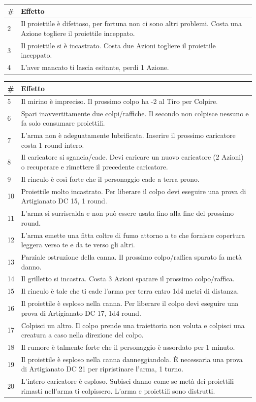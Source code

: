 \begin{multicols}{2}
\noindent\begin{tabularx}{0.48\textwidth}{lX}
	\toprule
\textbf{\#}& \textbf{Effetto}\\
\toprule
2 & Il proiettile è difettoso, per fortuna non ci sono altri problemi. Costa una Azione togliere il proiettile inceppato.\\
3 & Il proiettile si è incastrato. Costa due Azioni togliere il proiettile inceppato.\\
4 & L'aver mancato ti lascia esitante, perdi 1 Azione.\\
\end{tabularx}
\noindent\begin{tabularx}{0.48\textwidth}{lX}
\textbf{\#}& \textbf{Effetto}\\
\toprule
5 & Il mirino è impreciso. Il prossimo colpo ha -2 al Tiro per Colpire.\\
6 & Spari inavvertitamente due colpi/raffiche. Il secondo non colpisce nessuno e fa solo consumare proiettili.\\
7 & L'arma non è adeguatamente lubrificata. Inserire il prossimo caricatore costa 1 round intero.\\
8 & Il caricatore si sgancia/cade. Devi caricare un nuovo caricatore (2 Azioni) o recuperare e rimettere il precedente caricatore.\\
9 & Il rinculo è così forte che il personaggio cade a terra prono.\\
10 & Proiettile molto incastrato. Per liberare il colpo devi eseguire una prova di Artigianato DC 15, 1 round.\\
11 & L'arma si surriscalda e non può essere usata fino alla fine del prossimo round.\\
12 & L'arma emette una fitta coltre di fumo attorno a te che fornisce copertura leggera verso te e da te verso gli altri.\\
13 & Parziale ostruzione della canna. Il prossimo colpo/raffica sparato fa metà danno.\\
14 & Il grilletto si incastra. Costa 3 Azioni sparare il prossimo colpo/raffica.\\
15 & Il rinculo è tale che ti cade l'arma per terra entro 1d4 metri di distanza.\\
16 & Il proiettile è esploso nella canna. Per liberare il colpo devi eseguire una prova di Artigianato DC 17, 1d4 round.\\
17 & Colpisci un altro. Il colpo prende una traiettoria non voluta e colpisci una creatura a caso nella direzione del colpo.\\
18 & Il rumore è talmente forte che il personaggio è assordato per 1 minuto.\\
19 & Il proiettile è esploso nella canna danneggiandola. È necessaria una prova di Artigianato DC 21 per ripristinare l'arma, 1 turno.\\
20 & L'intero caricatore è esploso. Subisci danno come se metà dei proiettili rimasti nell'arma ti colpissero. L'arma e proiettili sono distrutti.
\end{tabularx}


\end{multicols}
